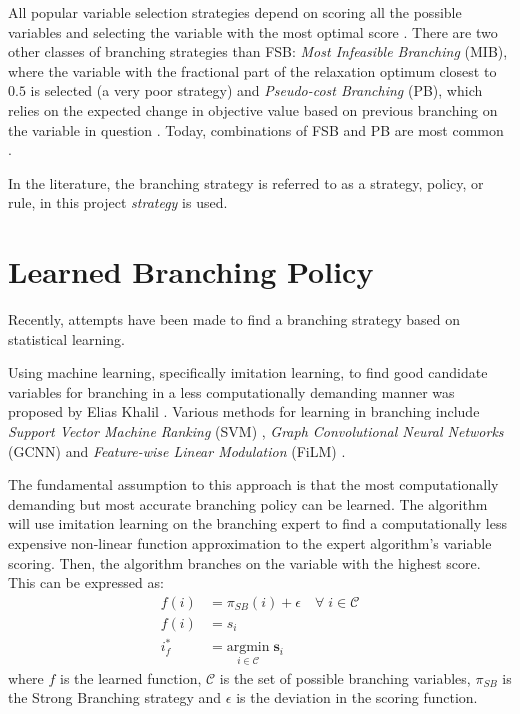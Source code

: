 All popular variable selection strategies depend on scoring all the possible variables and selecting the variable with the most optimal score \cite{achterberg2004branching}. There are two other classes of branching strategies than \gls{FSB}: \textit{Most Infeasible Branching} (\gls{MIB}), where the variable with the fractional part of the relaxation optimum closest to $0.5$ is selected (a very poor strategy) 
and \textit{Pseudo-cost Branching} (\gls{PB}), which relies on the expected change in objective value based on previous branching on the variable in question
\cite{achterberg2004branching}. Today, combinations of \gls{FSB} and \gls{PB} are most common \cite{anand2017comparative}.   

In the literature, the branching strategy is referred to as a strategy, policy, or rule, in this project \textit{strategy} is used.  


\section{Learned Branching Policy}

Recently, attempts have been made to find a branching strategy based on statistical learning. 

Using machine learning, specifically imitation learning, to find good candidate variables for branching in a less computationally demanding manner was proposed by Elias Khalil \cite{khalil2016learning}. Various methods for learning in branching include \textit{ Support Vector Machine Ranking} (\Gls{SVM}) \cite{khalil2016learning}, \textit{Graph Convolutional Neural Networks} (\gls{GCNN}) \cite{gasse2019exact} and \textit{Feature-wise Linear Modulation} (\gls{FiLM}) \cite{gupta2020hybrid}.

The fundamental assumption to this approach is that the most computationally demanding but most accurate branching policy can be learned. The algorithm will use imitation learning on the branching expert to find a computationally less expensive non-linear function approximation to the expert algorithm's variable scoring. Then, the algorithm branches on the variable with the highest score. This can be expressed as: 
\begin{align}
    f(i) &=  \pi_{SB} (i) + \epsilon \quad \forall \; i \in \mathcal{C}\\
    f(i) &= s_i\\
    i^*_f &= \underset{i \in \mathcal{C}}{\mathrm{argmin}} \; \bm{s}_i
\end{align}
where $f$ is the learned function, $\mathcal{C}$ is the set of possible branching variables, $\pi_{SB}$ is the Strong Branching strategy and $\epsilon$ is the deviation in the scoring function. 


